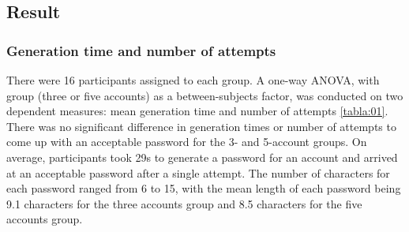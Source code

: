 \documentclass[fleqn]{Paquetes/RevDigMatEduInt}
\begin{document}
\subsection{Result} 
\subsubsection{Generation time and number of attempts}
There were 16 participants assigned to each group. A one-way ANOVA, with group (three or five accounts) as a between-subjects factor, was conducted on two dependent measures: mean generation time and number of attempts \ref{tabla:01}. \\ 
There was no significant difference in generation times or number of attempts to come up with an acceptable password for the 3- and 5-account groups. On average, participants took 29s to generate a password for an account and arrived at an acceptable password after a single attempt. The number of characters for each password ranged from 6 to 15, with the mean length of each password being 9.1 characters for the three accounts group and 8.5 characters for the five accounts group.
\end{document}
